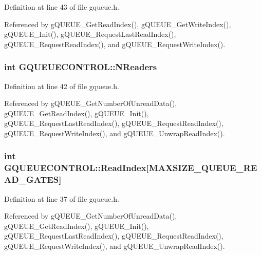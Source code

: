 Definition at line 43 of file gqueue.\-h.



Referenced by g\-Q\-U\-E\-U\-E\-\_\-\-Get\-Read\-Index(), g\-Q\-U\-E\-U\-E\-\_\-\-Get\-Write\-Index(), g\-Q\-U\-E\-U\-E\-\_\-\-Init(), g\-Q\-U\-E\-U\-E\-\_\-\-Request\-Last\-Read\-Index(), g\-Q\-U\-E\-U\-E\-\_\-\-Request\-Read\-Index(), and g\-Q\-U\-E\-U\-E\-\_\-\-Request\-Write\-Index().

\hypertarget{structGQUEUECONTROL_a790618cf693d7e4249fec2f5074b40e3}{
\subsubsection[{N\-Readers}]{\setlength{\rightskip}{0pt plus 5cm}int G\-Q\-U\-E\-U\-E\-C\-O\-N\-T\-R\-O\-L\-::\-N\-Readers}}\label{structGQUEUECONTROL_a790618cf693d7e4249fec2f5074b40e3}


Definition at line 42 of file gqueue.\-h.



Referenced by g\-Q\-U\-E\-U\-E\-\_\-\-Get\-Number\-Of\-Unread\-Data(), g\-Q\-U\-E\-U\-E\-\_\-\-Get\-Read\-Index(), g\-Q\-U\-E\-U\-E\-\_\-\-Init(), g\-Q\-U\-E\-U\-E\-\_\-\-Request\-Last\-Read\-Index(), g\-Q\-U\-E\-U\-E\-\_\-\-Request\-Read\-Index(), g\-Q\-U\-E\-U\-E\-\_\-\-Request\-Write\-Index(), and g\-Q\-U\-E\-U\-E\-\_\-\-Unwrap\-Read\-Index().

\hypertarget{structGQUEUECONTROL_aed43ab94887b0e203a23877fb26988b6}{
\subsubsection[{Read\-Index}]{\setlength{\rightskip}{0pt plus 5cm}int G\-Q\-U\-E\-U\-E\-C\-O\-N\-T\-R\-O\-L\-::\-Read\-Index\mbox{[}{\bf M\-A\-X\-S\-I\-Z\-E\-\_\-\-Q\-U\-E\-U\-E\-\_\-\-R\-E\-A\-D\-\_\-\-G\-A\-T\-E\-S}\mbox{]}}}\label{structGQUEUECONTROL_aed43ab94887b0e203a23877fb26988b6}


Definition at line 37 of file gqueue.\-h.



Referenced by g\-Q\-U\-E\-U\-E\-\_\-\-Get\-Number\-Of\-Unread\-Data(), g\-Q\-U\-E\-U\-E\-\_\-\-Get\-Read\-Index(), g\-Q\-U\-E\-U\-E\-\_\-\-Init(), g\-Q\-U\-E\-U\-E\-\_\-\-Request\-Last\-Read\-Index(), g\-Q\-U\-E\-U\-E\-\_\-\-Request\-Read\-Index(), g\-Q\-U\-E\-U\-E\-\_\-\-Request\-Write\-Index(), and g\-Q\-U\-E\-U\-E\-\_\-\-Unwrap\-Read\-Index().

